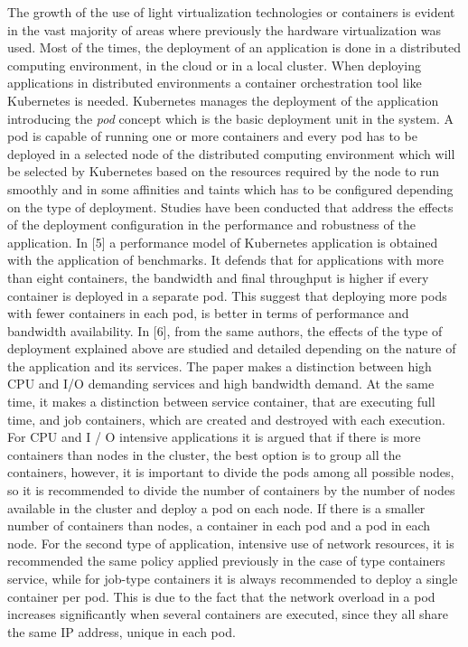 \documentclass[conference]{IEEEtran}
\begin{document}
The growth of the use of light virtualization technologies or containers is evident in the vast majority of areas where previously the hardware virtualization was used. Most of the times, the deployment of an application is done in a distributed computing environment, in the cloud or in a local cluster. When deploying applications in distributed environments a container orchestration tool like Kubernetes is needed. Kubernetes manages the deployment of the application introducing the \emph{pod} concept which is the basic deployment unit in the system. A pod is capable of running one or more containers and every pod has to be deployed in 
a selected node of the distributed computing environment which will be selected by Kubernetes based on the resources required by the node to run smoothly and
in some affinities and taints which has to be configured depending on the type of deployment. Studies have been conducted that address the effects of the deployment 
configuration in the performance and robustness of the application. In [5] a performance model of Kubernetes application is obtained with the application of benchmarks.
It defends that for applications with more than eight containers, the bandwidth and final throughput is higher if every container is deployed in a separate pod. This suggest
that deploying more pods with fewer containers in each pod, is better in terms of performance and bandwidth availability. In [6], from the same authors, the 
effects of the type of deployment explained above are studied and detailed depending on the nature of the application and its services. The paper makes a
distinction between high CPU and I/O demanding services and high bandwidth demand. At the same time, it makes a distinction between service container,
that are executing full time, and job containers, which are created and destroyed with each execution. 
For CPU and I / O intensive applications it is argued that if there is more containers than nodes in the cluster, the best option is to group all the 
containers, however, it is important to divide the pods among all possible nodes, so it is recommended to divide the number of containers by the number of nodes 
available in the cluster and deploy a pod on each node. If there is a smaller number of containers than nodes, a container in each pod and a pod in each node. 
For the second type of application, intensive use of network resources, it is recommended the same policy applied previously in the case of type containers
service, while for job-type containers it is always recommended to deploy a single container per pod. This is due to the fact that the network overload in a pod
increases significantly when several containers are executed, since they all share the same IP address, unique in each pod.
\end{document}
